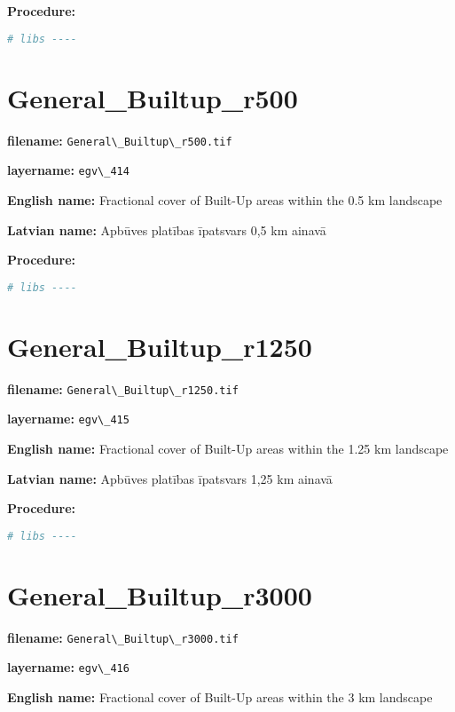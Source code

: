 \documentclass[
]{book}
\newcommand{\passthrough}[1]{#1}
\begin{document}
\textbf{Procedure:}

\begin{lstlisting}[language=R]
# libs ----
\end{lstlisting}

\section{General\_Builtup\_r500}\label{ch06.414}

\textbf{filename:} \passthrough{\lstinline!General\_Builtup\_r500.tif!}

\textbf{layername:} \passthrough{\lstinline!egv\_414!}

\textbf{English name:} Fractional cover of Built-Up areas within the 0.5 km landscape

\textbf{Latvian name:} Apbūves platības īpatsvars 0,5 km ainavā

\textbf{Procedure:}

\begin{lstlisting}[language=R]
# libs ----
\end{lstlisting}

\section{General\_Builtup\_r1250}\label{ch06.415}

\textbf{filename:} \passthrough{\lstinline!General\_Builtup\_r1250.tif!}

\textbf{layername:} \passthrough{\lstinline!egv\_415!}

\textbf{English name:} Fractional cover of Built-Up areas within the 1.25 km landscape

\textbf{Latvian name:} Apbūves platības īpatsvars 1,25 km ainavā

\textbf{Procedure:}

\begin{lstlisting}[language=R]
# libs ----
\end{lstlisting}

\section{General\_Builtup\_r3000}\label{ch06.416}

\textbf{filename:} \passthrough{\lstinline!General\_Builtup\_r3000.tif!}

\textbf{layername:} \passthrough{\lstinline!egv\_416!}

\textbf{English name:} Fractional cover of Built-Up areas within the 3 km landscape
\end{document}
